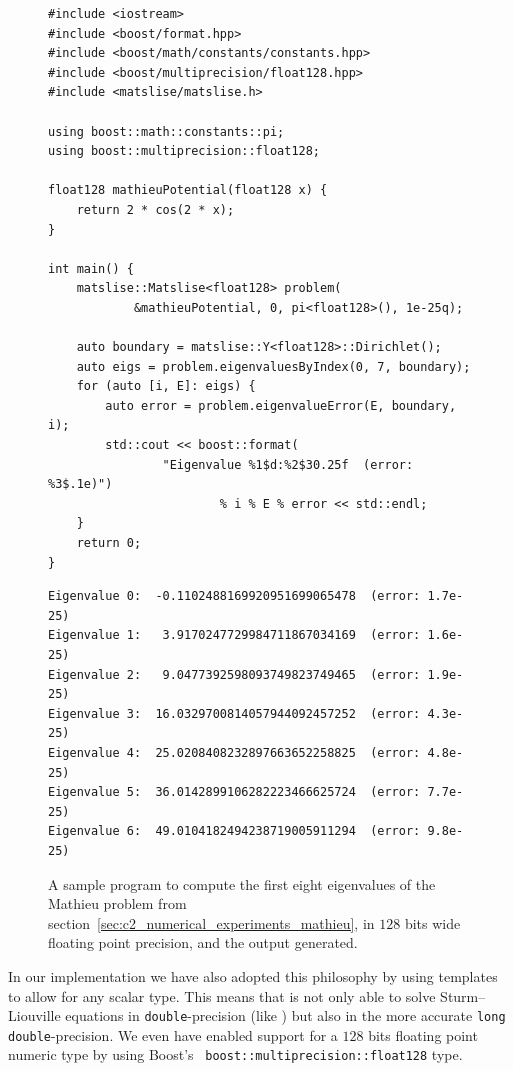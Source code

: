 \begin{figure}
\begin{verbatim}
#include <iostream>
#include <boost/format.hpp>
#include <boost/math/constants/constants.hpp>
#include <boost/multiprecision/float128.hpp>
#include <matslise/matslise.h>

using boost::math::constants::pi;
using boost::multiprecision::float128;

float128 mathieuPotential(float128 x) {
    return 2 * cos(2 * x);
}

int main() {
    matslise::Matslise<float128> problem(
            &mathieuPotential, 0, pi<float128>(), 1e-25q);

    auto boundary = matslise::Y<float128>::Dirichlet();
    auto eigs = problem.eigenvaluesByIndex(0, 7, boundary);
    for (auto [i, E]: eigs) {
        auto error = problem.eigenvalueError(E, boundary, i);
        std::cout << boost::format(
                "Eigenvalue %1$d:%2$30.25f  (error: %3$.1e)")
                        % i % E % error << std::endl;
    }
    return 0;
}
\end{verbatim}
    \vspace{8mm}
\begin{verbatim}
Eigenvalue 0:  -0.1102488169920951699065478  (error: 1.7e-25)
Eigenvalue 1:   3.9170247729984711867034169  (error: 1.6e-25)
Eigenvalue 2:   9.0477392598093749823749465  (error: 1.9e-25)
Eigenvalue 3:  16.0329700814057944092457252  (error: 4.3e-25)
Eigenvalue 4:  25.0208408232897663652258825  (error: 4.8e-25)
Eigenvalue 5:  36.0142899106282223466625724  (error: 7.7e-25)
Eigenvalue 6:  49.0104182494238719005911294  (error: 9.8e-25)
\end{verbatim}
    \caption{A sample program to compute the first eight eigenvalues of the Mathieu problem from section~\ref{sec:c2_numerical_experiments_mathieu}, in $128$ bits wide floating point precision, and the output generated.}
    \label{fig:c2_mathieu_quad_code}
\end{figure}

In our implementation we have also adopted this philosophy by using templates to allow for any scalar type. This means that  is not only able to solve Sturm--Liouville equations in \texttt{double}-precision (like ) but also in the more accurate \texttt{long double}-precision. We even have enabled support for a $128$ bits floating point  numeric type by using Boost's~\cite{boost_float128_} \texttt{boost::multiprecision::float128} type.

